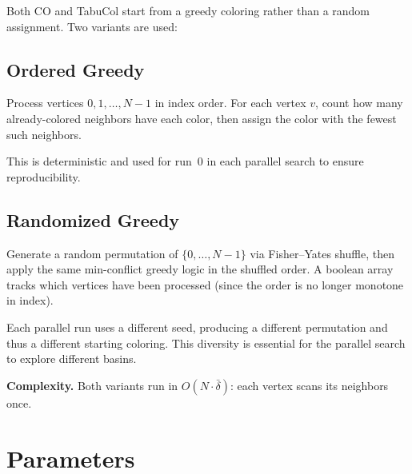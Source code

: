 \documentclass[11pt,a4paper]{article}
\begin{document}
Both CO and TabuCol start from a greedy coloring rather than a random assignment. Two
variants are used:

\subsection{Ordered Greedy}

Process vertices $0, 1, \ldots, N-1$ in index order. For each vertex $v$, count how many
already-colored neighbors have each color, then assign the color with the fewest such
neighbors.

This is deterministic and used for run~0 in each parallel search to ensure
reproducibility.

\subsection{Randomized Greedy}

Generate a random permutation of $\{0, \ldots, N-1\}$ via Fisher--Yates shuffle, then
apply the same min-conflict greedy logic in the shuffled order. A boolean array tracks
which vertices have been processed (since the order is no longer monotone in index).

Each parallel run uses a different seed, producing a different permutation and thus a
different starting coloring. This diversity is essential for the parallel search to
explore different basins.

\textbf{Complexity.} Both variants run in $O(N \cdot \bar{\delta})$: each vertex scans
its neighbors once.


\section{Parameters}
\end{document}
